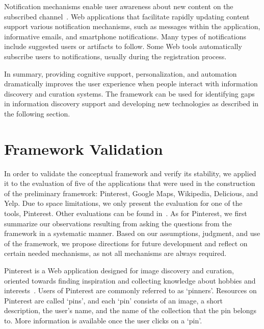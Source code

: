 \documentclass{sigchi}
\begin{document}
{{{{Notification mechanisms enable user awareness about new content on the subscribed channel~\cite{millen2005social}. Web applications that facilitate rapidly updating content support various notification mechanisms, such as messages within the application, informative emails, and smartphone notifications. Many types of notifications include suggested users or artifacts to follow. Some Web tools automatically subscribe users to notifications, usually during the registration process.
} %

In summary, providing cognitive support, personalization, and automation dramatically improves the user experience when people interact with information discovery and curation systems. The framework can be used for identifying gaps in information discovery support and developing new technologies as described in the following section.  
}

\section{Framework Validation}
\label{section:validation}
In order to validate the conceptual framework and verify its stability, we applied it to the evaluation of five of the applications that were used in the construction of the preliminary framework: Pinterest, Google Maps, Wikipedia, Delicious, and Yelp. Due to space limitations, we only present the evaluation for one of the tools, Pinterest. Other evaluations can be found in~\cite{voyloshnikova2015}. As for Pinterest, we first summarize our observations resulting from asking the questions from the framework in a systematic manner. Based on our assumptions, judgment, and use of the framework, we propose directions for future development and reflect on certain needed mechanisms, as not all mechanisms are always required.  

Pinterest is a Web application designed for image discovery and curation, oriented towards finding inspiration and collecting knowledge about hobbies and interests~\cite{gilbert2013need,zarro2012pinterest,ottoni2013ladies}.  Users of Pinterest are commonly referred to as `pinners'. Resources on Pinterest are called `pins', and each `pin' consists of an image, a short description, the user's name, and the name of the collection that the pin belongs to. More information is available once the user clicks on a `pin'.

}}
\end{document}
